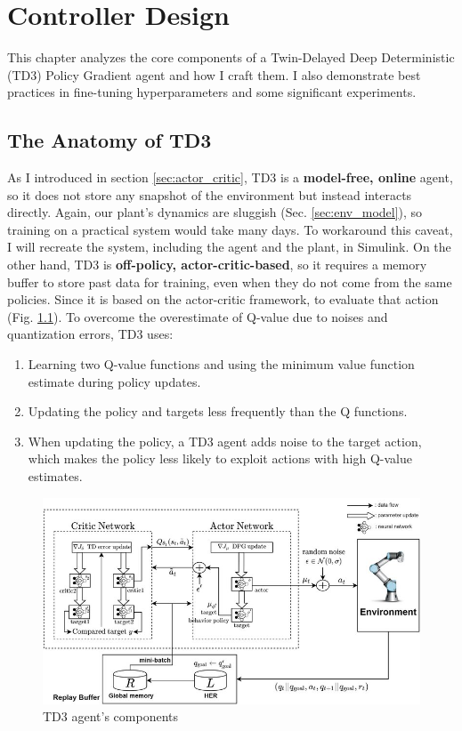 \documentclass[../main.tex]{subfiles}
\begin{document}
\chapter{Controller Design} \label{chap:ctrl_design}
This chapter analyzes the core components of a Twin-Delayed Deep Deterministic (TD3) Policy Gradient agent and how I craft them. I also demonstrate best practices in fine-tuning hyperparameters and some significant experiments. 


\section{The Anatomy of TD3}
As I introduced in section \ref{sec:actor_critic}, TD3 is a \textbf{model-free, online} agent, so it does not store any snapshot of the environment but instead interacts directly. Again, our plant's dynamics are sluggish (Sec. \ref{sec:env_model}), so training on a practical system would take many days. To workaround this caveat, I will recreate the system, including the agent and the plant, in Simulink. On the other hand, TD3 is \textbf{off-policy, actor-critic-based}, so it requires a memory buffer to store past data for training, even when they do not come from the same policies. Since it is based on the actor-critic framework, to evaluate that action (Fig. \ref{fig:td3}). To overcome the overestimate of Q-value due to noises and quantization errors, TD3 uses:
\begin{enumerate}
    \item Learning two Q-value functions and using the minimum value function estimate during policy updates.
    \item Updating the policy and targets less frequently than the Q functions.
    \item When updating the policy, a TD3 agent adds noise to the target action, which makes the policy less likely to exploit actions with high Q-value estimates.
\end{enumerate}
\begin{figure}[htbp]
    \centering
    \includegraphics[width=\linewidth]{figures/td3.png}
    \caption{TD3 agent's components \cite{kim20motionplanning}}
    \label{fig:td3}
\end{figure}
\end{document}

